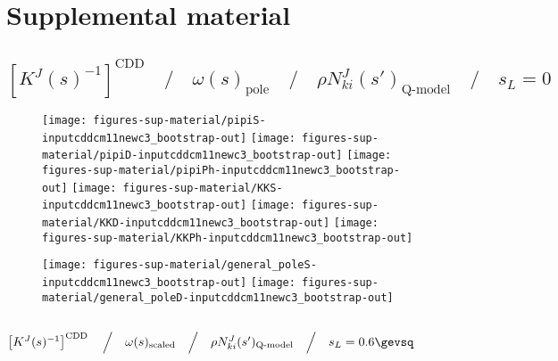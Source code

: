\clearpage
\section{Supplemental material}
\label{sup:supp-material}


\subsection{$\left[K^J(s)^{-1}\right]^\text{CDD} \quad\Big/\quad \omega(s)_\text{pole} \quad\Big/\quad \rho N^J_{ki}(s')_\text{Q-model} \quad\Big/\quad s_L = 0$}
\label{subsec:inputcddcm11newc3_bootstrap-out}






\begin{figure}[h]
\centering\texttt{[image: figures-sup-material/pipiS-inputcddcm11newc3\_bootstrap-out]} \texttt{[image: figures-sup-material/pipiD-inputcddcm11newc3\_bootstrap-out]} \texttt{[image: figures-sup-material/pipiPh-inputcddcm11newc3\_bootstrap-out]}
\texttt{[image: figures-sup-material/KKS-inputcddcm11newc3\_bootstrap-out]} \texttt{[image: figures-sup-material/KKD-inputcddcm11newc3\_bootstrap-out]} \texttt{[image: figures-sup-material/KKPh-inputcddcm11newc3\_bootstrap-out]}
\end{figure}

\begin{figure}[h]
\centering\texttt{[image: figures-sup-material/general\_poleS-inputcddcm11newc3\_bootstrap-out]} \texttt{[image: figures-sup-material/general\_poleD-inputcddcm11newc3\_bootstrap-out]}
\end{figure}



\clearpage

\subsection{$\left[K^J(s)^{-1}\right]^\text{CDD} \quad\Big/\quad \omega(s)_\text{scaled} \quad\Big/\quad \rho N^J_{ki}(s')_\text{Q-model} \quad\Big/\quad s_L = 0.6\gevsq$}
\label{subsec:inputcddcm3newc3_bootstrap-out}



